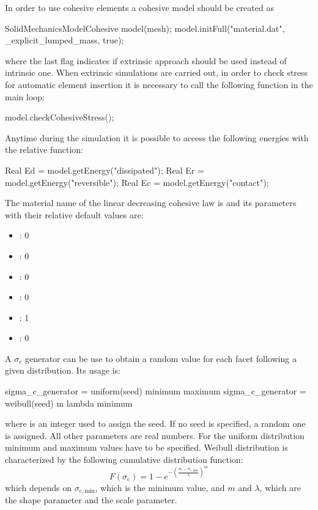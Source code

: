 In order to use cohesive elements a cohesive model
should be created as
\begin{cpp}
  SolidMechanicsModelCohesive model(mesh);
  model.initFull("material.dat", _explicit_lumped_mass, true);
\end{cpp}
where the last flag indicates if extrinsic approach should be used
instead of intrinsic one. When extrinsic simulations are carried out,
in order to check stress for automatic element insertion it is
necessary to call the following function in the main loop:
\begin{cpp}
  model.checkCohesiveStress();
\end{cpp}
Anytime during the simulation it is possible to access the following
energies with the relative function:
\begin{cpp}
  Real Ed = model.getEnergy("dissipated");
  Real Er = model.getEnergy("reversible");
  Real Ec = model.getEnergy("contact");
\end{cpp}
The material name of the linear decreasing cohesive law  is
 and its parameters with their
relative default values are:
\begin{itemize}
\item {}: 0
\item {}: 0
\item {}: 0
\item {}: 0
\item {}: 1
\item {}: 0
\end{itemize}
A $\sigma_\mathrm{c}$ generator can be use to obtain a random value
for each facet following a given distribution. Its usage is:
\begin{cpp}
  sigma_c_generator = uniform(seed) minimum maximum
  sigma_c_generator = weibull(seed) m lambda minimum
\end{cpp}
where  is an integer used to assign the seed. If no seed is
specified, a random one is assigned. All other parameters are real
numbers. For the uniform distribution minimum and maximum values have
to be specified. Weibull distribution is characterized by the
following cumulative distribution function:
\begin{equation}
    F(\sigma_\mathrm{c}) = 1- e^{-\left(
      \frac{\sigma_c-\sigma_\mathrm{c, min}}{\lambda} \right)^m}
\end{equation}
which depends on $\sigma_\mathrm{c, min}$, which is the minimum value,
and $m$ and $\lambda$, which are the shape parameter and the scale
parameter.

